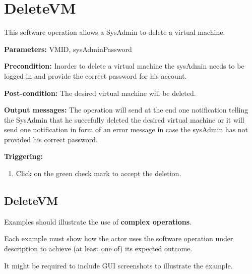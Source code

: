 \section{DeleteVM}
\label{operation:DeleteVM}
This software operation allows a SysAdmin to delete a virtual machine. 
\begin{description}

\item \textbf{Parameters:} VMID, sysAdminPassword
\item \textbf{Precondition:} Inorder to delete a virtual machine the sysAdmin
needs to be logged in and provide the correct password for his account.

\item \textbf{Post-condition:} The desired virtual machine will be deleted.
\item \textbf{Output messages:} The operation will send at the end one
notification telling the SysAdmin that he succefully deleted the desired
virtual machine or it will send one notification in form of an error message in
case the sysAdmin has not provided his correct password.

\item \textbf{Triggering:}
\begin{enumerate}
\item Click on the green check mark to accept the deletion.
\end{enumerate}

 
\end{description}

 
\subsection{DeleteVM}
Examples should illustrate the use of \textbf{complex operations}.

Each example must show how the actor uses the software operation under
description to achieve (at least one of) its expected outcome.

It might be required to include GUI screenshots to illustrate the example.











